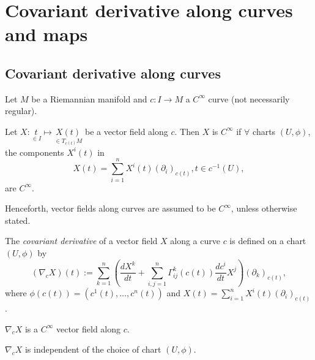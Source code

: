 \section{Covariant derivative along curves and maps}

\subsection{Covariant derivative along curves}

Let $M$ be a Riemannian manifold and $c:I\to M$ a $C^{\infty}$ curve (not necessarily regular).

\begin{definition}
Let $X:\underset{\in I}{t} \mapsto \underset{\in T_{c(t)}M}{X(t)}$ be a vector field along $c$.
Then $X$ is $C^{\infty}$ if $\forall$ charts $(U,\phi)$, the components $X^i(t)$ in
\[
X(t) = \sum_{i=1}^n X^i(t)(\partial_i)_{c(t)}, t \in c^{-1}(U),
\]
are $C^{\infty}$.
\end{definition}

Henceforth, vector fields along curves are assumed to be $C^{\infty}$, unless otherwise stated.

\begin{definition}
The \emph{covariant derivative} of a vector field $X$ along a curve $c$ is defined on a chart $(U, \phi)$ by
\[
(\nabla_cX)(t) := \sum_{k=1}^n \left( \frac{dX^k}{dt} + \sum_{i,j=1}^n \Gamma_{ij}^k(c(t))\frac{dc^i}{dt}X^j \right)(\partial_k)_{c(t)},
\]
where $\phi(c(t)) = (c^1(t), \dots, c^n(t))$ and $X(t) = \sum_{i=1}^n X^i(t)(\partial_i)_{c(t)}$.
\end{definition}

\begin{remark}
$\nabla_cX$ is a $C^{\infty}$ vector field along $c$.
\end{remark}

\begin{lemma}
$\nabla_cX$ is independent of the choice of chart $(U, \phi)$.
\end{lemma}

